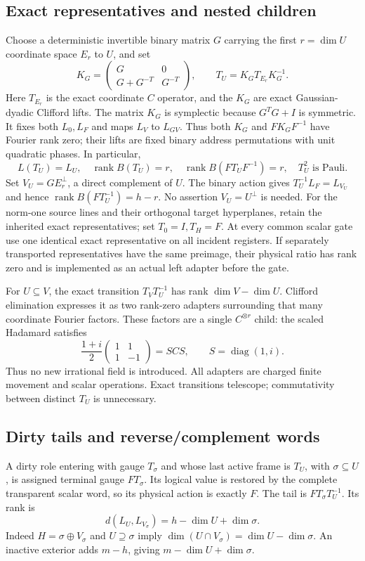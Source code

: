 \subsection{Exact representatives and nested children}
Choose a deterministic invertible binary matrix $G$ carrying the first
$r=\dim U$ coordinate space $E_r$ to $U$, and set
\[
 K_G=\begin{pmatrix}G&0\\G+G^{-T}&G^{-T}\end{pmatrix},\qquad
 T_U=K_G T_{E_r}K_G^{-1}.
\]
Here $T_{E_r}$ is the exact coordinate $C$ operator, and the $K_G$ are
exact Gaussian-dyadic Clifford lifts. The matrix $K_G$ is symplectic
because $G^TG+I$ is symmetric. It fixes both $L_0,L_F$ and maps $L_V$
to $L_{GV}$. Thus both $K_G$ and $FK_GF^{-1}$ have Fourier rank zero;
their lifts are fixed binary address permutations with unit quadratic
phases. In particular,
\[
 L(T_U)=L_U,\quad \operatorname{rank}B(T_U)=r,\quad
 \operatorname{rank}B(FT_UF^{-1})=r,\quad T_U^2\text{ is Pauli}.
\]
Set $V_U=GE_r^\perp$, a direct complement of $U$. The binary action gives
$T_U^{-1}L_F=L_{V_U}$ and hence
$\operatorname{rank}B(FT_U^{-1})=h-r$.
No assertion $V_U=U^\perp$ is needed.
For the norm-one source lines and their orthogonal target hyperplanes,
retain the inherited exact representatives; set $T_0=I,T_H=F$.
At every common scalar gate use one identical exact representative on all
incident registers. If separately transported representatives have the
same preimage, their physical ratio has rank zero and is implemented as
an actual left adapter before the gate.

For $U\subseteq V$, the exact transition $T_VT_U^{-1}$ has rank
$\dim V-\dim U$. Clifford elimination expresses it as two rank-zero
adapters surrounding that many coordinate Fourier factors. These factors
are a single $C^{\otimes r}$ child: the scaled Hadamard satisfies
\[
 \frac{1+i}{2}\begin{pmatrix}1&1\\1&-1\end{pmatrix}
   =SCS,\qquad S=\operatorname{diag}(1,i).
\]
Thus no new irrational field is introduced. All adapters are charged
finite movement and scalar operations. Exact transitions telescope;
commutativity between distinct $T_U$ is unnecessary.

\subsection{Dirty tails and reverse/complement words}
A dirty role entering with gauge $T_\sigma$ and whose last active frame
is $T_U$, with $\sigma\subseteq U$, is assigned terminal gauge
$FT_\sigma$. Its logical value is restored by the complete transparent
scalar word, so its physical action is exactly $F$. The tail is
$FT_\sigma T_U^{-1}$. Its rank is
\[
 d(L_U,L_{V_\sigma})=h-\dim U+\dim\sigma.
\]
Indeed $H=\sigma\oplus V_\sigma$ and $U\supseteq\sigma$ imply
$\dim(U\cap V_\sigma)=\dim U-\dim\sigma$.
An inactive exterior adds $m-h$, giving $m-\dim U+\dim\sigma$.

